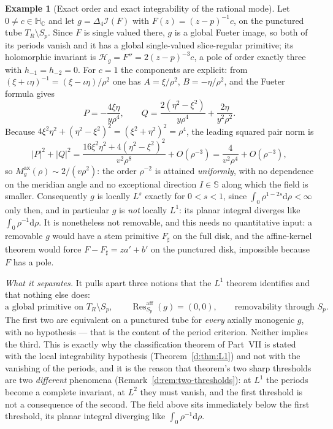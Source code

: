 \documentclass[11pt,a4paper]{article}
\numberwithin{equation}{section}
\theoremstyle{definition}
\newtheorem{example}[theorem]{Example}
\theoremstyle{remark}
\theoremstyle{plain}
\newcommand{\HC}{\mathbb H_{\mathbb C}}
\newcommand{\SSS}{\mathbb S}
\newcommand{\lap}{\Delta_4}
\newcommand{\I}{\mathcal I}
\newcommand{\Sp}{S_{p}}
\newcommand{\Hg}{\mathcal H_{g}}      %
\newcommand{\Max}{M^{\mathrm{ax}}}                    %
\newcommand{\Tube}{T}
\newcommand{\abs}[1]{\lvert #1\rvert}
\newcommand{\dd}{\mathrm d}
\newcommand{\Resaff}{\operatorname{Res}^{\mathrm{aff}}}
\begin{document}
\begin{example}[Exact order and exact integrability of the rational mode]
\label{f:ex:rational-mode}
Let $0\ne c\in\HC$ and let $g=\lap\I(F)$ with $F(z)=(z-p)^{-1}c$, on the
punctured tube $\Tube_R\setminus\Sp$. Since $F$ is single valued there, $g$
is a global Fueter image, so both of its periods vanish and it has a global
single-valued slice-regular primitive; its holomorphic invariant is
$\Hg=F''=2(z-p)^{-3}c$, a pole of order exactly three with
$h_{-1}=h_{-2}=0$. For $c=1$ the components are explicit: from
$(\xi+\iota\eta)^{-1}=(\xi-\iota\eta)/\rho^2$ one has
$A=\xi/\rho^2$, $B=-\eta/\rho^2$, and the Fueter formula gives
\begin{equation}
 P=-\frac{4\xi\eta}{y\rho^{4}},\qquad
 Q=\frac{2(\eta^{2}-\xi^{2})}{y\rho^{4}}+\frac{2\eta}{y^{2}\rho^{2}} .
 \label{f:eq:rational-PQ}
\end{equation}
Because $4\xi^2\eta^2+(\eta^2-\xi^2)^2=(\xi^2+\eta^2)^2=\rho^4$, the
leading squared pair norm is
\begin{equation}
 \abs P^{2}+\abs Q^{2}
 =\frac{16\xi^{2}\eta^{2}+4(\eta^{2}-\xi^{2})^{2}}{v^{2}\rho^{8}}
 +O(\rho^{-3})
 =\frac{4}{v^{2}\rho^{4}}+O(\rho^{-3}),
 \label{f:eq:rational-size}
\end{equation}
so $\Max_g(\rho)\sim2/(v\rho^2)$: the order $\rho^{-2}$ is attained
\emph{uniformly}, with no dependence on the meridian angle and no
exceptional direction $I\in\SSS$ along which the field is smaller.
Consequently $g$ is locally $L^s$ exactly for $0<s<1$, since
$\int_0\rho^{1-2s}\dd\rho<\infty$ only then, and in particular $g$ is
\emph{not} locally $L^1$: its planar integral diverges like
$\int_0\rho^{-1}\dd\rho$. It is nonetheless not removable, and this needs
no quantitative input: a removable $g$ would have a stem primitive
$F_\sharp$ on the full disk, and the affine-kernel theorem would force
$F-F_\sharp=za'+b'$ on the punctured disk, impossible because $F$ has a
pole.
\end{example}

\emph{What it separates.} It pulls apart three notions that the $L^1$
theorem identifies and that nothing else does:
\[
 \text{a global primitive on }\Tube_R\setminus\Sp,
 \qquad
 \Resaff_{\Sp}(g)=(0,0),
 \qquad
 \text{removability through }\Sp .
\]
The first two are equivalent on a punctured tube for \emph{every} axially
monogenic $g$, with no hypothesis --- that is the content of the period
criterion. Neither implies the third. This is exactly why the classification
theorem of Part~VII is stated with the local integrability hypothesis
(Theorem~\ref{d:thm:L1}) and not with the vanishing of the periods, and it
is the reason that theorem's two sharp thresholds are two \emph{different}
phenomena (Remark~\ref{d:rem:two-thresholds}): at $L^1$ the periods become
a complete invariant, at $L^2$ they must vanish, and the first threshold is
not a consequence of the second. The field above sits immediately below the
first threshold, its planar integral diverging like
$\int_0\rho^{-1}\dd\rho$.
\end{document}
